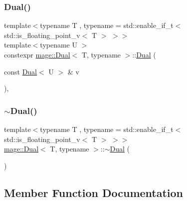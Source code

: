 \subsubsection{\texorpdfstring{Dual()}{Dual()}\hspace{0.1cm}{\footnotesize\ttfamily [5/5]}}
{\footnotesize\ttfamily template$<$typename T , typename  = std\+::enable\+\_\+if\+\_\+t$<$ std\+::is\+\_\+floating\+\_\+point\+\_\+v$<$ T $>$ $>$$>$ \\
template$<$typename U $>$ \\
constexpr \mbox{\hyperlink{structmage_1_1_dual}{mage\+::\+Dual}}$<$ T, typename $>$\+::\mbox{\hyperlink{structmage_1_1_dual}{Dual}} (\begin{DoxyParamCaption}\item[{const \mbox{\hyperlink{structmage_1_1_dual}{Dual}}$<$ U $>$ \&}]{v }\end{DoxyParamCaption})\hspace{0.3cm}{\ttfamily [explicit]}, {\ttfamily [noexcept]}}

\mbox{\label{structmage_1_1_dual_a366d044291e2f14f65c0b7e3b98e7642}} 
\subsubsection{\texorpdfstring{$\sim$\+Dual()}{~Dual()}}
{\footnotesize\ttfamily template$<$typename T , typename  = std\+::enable\+\_\+if\+\_\+t$<$ std\+::is\+\_\+floating\+\_\+point\+\_\+v$<$ T $>$ $>$$>$ \\
\mbox{\hyperlink{structmage_1_1_dual}{mage\+::\+Dual}}$<$ T, typename $>$\+::$\sim$\mbox{\hyperlink{structmage_1_1_dual}{Dual}} (\begin{DoxyParamCaption}{ }\end{DoxyParamCaption})\hspace{0.3cm}{\ttfamily [default]}}



\subsection{Member Function Documentation}
\mbox{\label{structmage_1_1_dual_a2c45ed99742d46e2c837a302ebf72d06}} 
